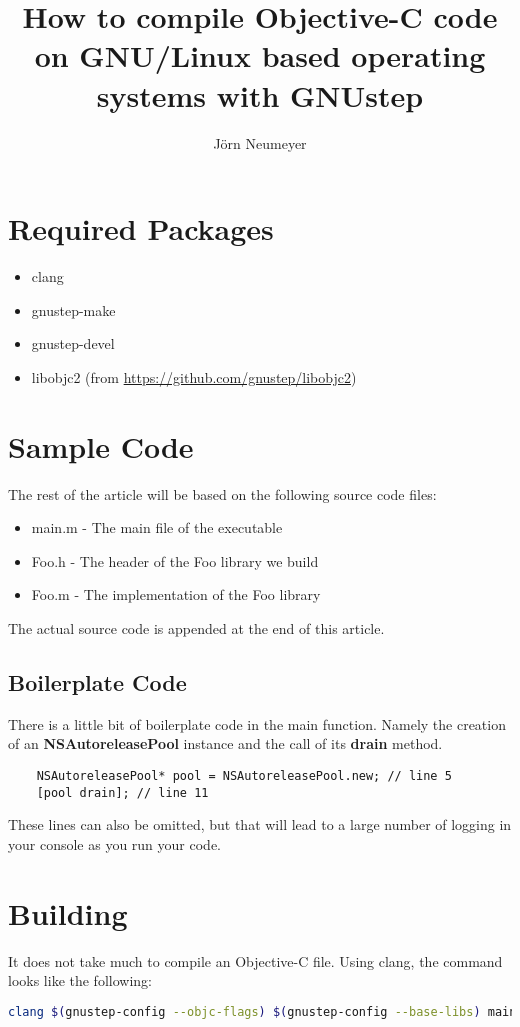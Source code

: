 \documentclass{article}
\title{How to compile Objective-C code on GNU/Linux based operating systems with GNUstep}
\author{J\"orn Neumeyer}
\begin{document}
  \maketitle
  \section{Required Packages}
  \begin{itemize}
    \item clang
    \item gnustep-make
    \item gnustep-devel
    \item libobjc2 (from \url{https://github.com/gnustep/libobjc2})
  \end{itemize}
  \section{Sample Code}
  The rest of the article will be based on the following source code files:
  \begin{itemize}
    \item main.m - The main file of the executable
    \item Foo.h - The header of the Foo library we build
    \item Foo.m - The implementation of the Foo library
  \end{itemize}
  The actual source code is appended at the end of this article.
  \subsection{Boilerplate Code}
  There is a little bit of boilerplate code in the main function.
  Namely the creation of an \textbf{NSAutoreleasePool} instance and the call of its \textbf{drain} method.
  \begin{lstlisting}
    NSAutoreleasePool* pool = NSAutoreleasePool.new; // line 5
    [pool drain]; // line 11
  \end{lstlisting}
  These lines can also be omitted, but that will lead to a large number of logging in your console as you run your code.
  \section{Building}
  It does not take much to compile an Objective-C file.
  Using clang, the command looks like the following:
  \begin{lstlisting}[language=bash]
    clang $(gnustep-config --objc-flags) $(gnustep-config --base-libs) main.m
  \end{lstlisting}
\end{document}
